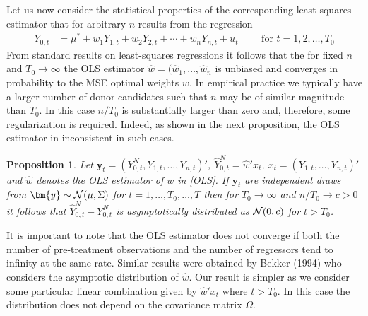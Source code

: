 \documentclass[12pt,a4paper]{article}
\newtheorem{proposition}{Proposition}
\begin{document}
Let us now consider the statistical properties of the corresponding least-squares estimator that for arbitrary $n$ results from the regression
\begin{align}
Y_{0,t} &= \mu^* + w_1 Y_{1,t} + w_2 Y_{2,t} + \cdots + w_n Y_{n,t} + u_t \qquad  \text{ for } t=1,2,\ldots,T_0 \label{OLS}
\end{align}
From standard results on least-squares regressions it follows that the for fixed $n$ and $T_0 \to \infty$ the OLS estimator $\widehat w = (\widehat w_1,\ldots,\widehat w_n$ is unbiased and converges in probability to the MSE optimal weights $w$. In empirical practice we typically have a larger number of donor candidates such that $n$ may be of similar magnitude than $T_0$. In this case $n/T_0$ is substantially larger than zero and, therefore, some regularization is required. Indeed, as shown in the next proposition, the OLS estimator in inconsistent in such cases.
\medskip

\begin{proposition}
Let $\bm{y}_t=(Y_{0,t}^N,Y_{1,t},\ldots, Y_{n,t})'$, $\widehat Y_{0,t}^N = \widehat w'x_t$, $x_t=(Y_{1,t},\ldots,Y_{n,t})'$ and $\widehat w$ denotes the OLS estimator of $w$ in \eqref{OLS}. If $\bm{y}_t$ are independent draws from $\bm{y} \sim {\cal N}(\mu,\Sigma)$ for $t=1,\ldots,T_0,\ldots,T$ then for $T_0 \to \infty$ and $n/T_0 \to c>0$ it follows that $\widehat Y_{0,t}^N - Y_{0,t}^N$ is asymptotically distributed as ${\cal N}(0,c)$  for $t>T_0$.
\end{proposition}
\medskip

\noindent
It is important to note that the OLS estimator does not converge if both the number of pre-treatment observations and the number of regressors tend to infinity at the same rate. Similar results were obtained by Bekker (1994) who considers the asymptotic distribution of $\widehat w$. Our result is simpler as we consider some particular linear combination given by $\widehat w'x_t$ where $t>T_0$. In this case the distribution does not depend on the covariance matrix $\Omega$.
\end{document}

